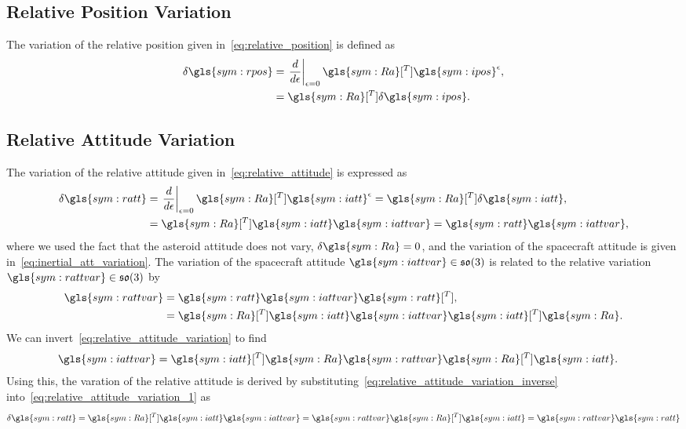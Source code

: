 \subsection{Relative Position Variation}\label{sec:relative_position_variation}
The variation of the relative position given in~\cref{eq:relative_position} is defined as
\begin{align}
    \delta \gls{sym:rpos} &= \left. \diff{}{\epsilon} \right|_{\epsilon=0} \gls{sym:Ra}[^T] \gls{sym:ipos}^\epsilon ,\nonumber \\
                        &= \gls{sym:Ra}[^T] \delta \gls{sym:ipos} .\label{eq:relative_position_variation}
\end{align}

\subsection{Relative Attitude Variation}\label{sec:relative_attitude_variation}
The variation of the relative attitude given in~\cref{eq:relative_attitude} is expressed as
\begin{align}
    \delta \gls{sym:ratt} &= \left. \diff{}{\epsilon} \right|_{\epsilon=0}  \gls{sym:Ra}[^T] \gls{sym:iatt}^\epsilon = \gls{sym:Ra}[^T] \delta \gls{sym:iatt}, \nonumber\\
                          &= \gls{sym:Ra}[^T] \gls{sym:iatt} \gls{sym:iattvar} = \gls{sym:ratt} \gls{sym:iattvar}, \label{eq:relative_attitude_variation_1}
\end{align}
where we used the fact that the asteroid attitude does not vary, \( \delta \gls{sym:Ra} = 0\), and the variation of the spacecraft attitude is given in~\cref{eq:inertial_att_variation}.
The variation of the spacecraft attitude \( \gls{sym:iattvar} \in \so \) is related to the relative variation \( \gls{sym:rattvar} \in \so \) by
\begin{align}
    \gls{sym:rattvar} &= \gls{sym:ratt} \gls{sym:iattvar} \gls{sym:ratt}[^T],\nonumber\\
                      &= \gls{sym:Ra}[^T] \gls{sym:iatt} \gls{sym:iattvar} \gls{sym:iatt}[^T] \gls{sym:Ra}.\label{eq:relative_attitude_variation}
\end{align}
We can invert~\cref{eq:relative_attitude_variation} to find
\begin{align}\label{eq:relative_attitude_variation_inverse}
    \gls{sym:iattvar} &= \gls{sym:iatt}[^T] \gls{sym:Ra} \gls{sym:rattvar} \gls{sym:Ra}[^T] \gls{sym:iatt}.
\end{align}
Using this, the varation of the relative attitude is derived by substituting~\cref{eq:relative_attitude_variation_inverse} into~\cref{eq:relative_attitude_variation_1} as
\begin{align}\label{eq:relative_attitude_matrix_variation}
    \delta \gls{sym:ratt} = \gls{sym:Ra}[^T] \gls{sym:iatt} \gls{sym:iattvar} = \gls{sym:rattvar} \gls{sym:Ra}[^T] \gls{sym:iatt} = \gls{sym:rattvar} \gls{sym:ratt}
\end{align}

